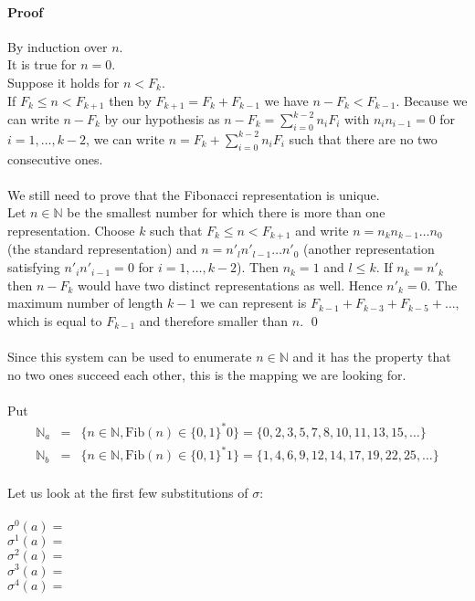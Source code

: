 \documentclass{article}
\begin{document}
\paragraph{Proof} By induction over $n$.\\
It is true for $n = 0$.\\
Suppose it holds for $n < F_k$.\\
If $F_k \le n < F_{k + 1}$ then by $F_{k + 1} = F_k + F_{k - 1}$ we have 
$n - F_k < F_{k - 1}$. Because we can write $n - F_k$ by our hypothesis as
$n - F_k = \sum_{i = 0}^{k - 2} n_i F_i$ with $n_i n_{i - 1} = 0$ for
$i = 1, \ldots, k - 2$, we can write $n = F_k + \sum_{i = 0}^{k - 2} n_i F_i$ 
such that there are no two consecutive ones.\\
\\
We still need to prove that the Fibonacci representation is unique.\\
Let $n \in \mathbb{N}$ be the smallest number for which there is more than one
representation. Choose $k$ such that $F_k \le n < F_{k + 1}$ and write
$n = n_k n_{k - 1} \ldots n_0$ (the standard representation) and
$n = n'_l n'_{l - 1} \ldots n'_0$ (another representation satisfying 
$n'_i n'_{i - 1} = 0$ for $i = 1, \ldots, k - 2$). Then $n_k = 1$ and $l \le k$.
If $n_k = n'_k$ then $n - F_k$ would have two distinct representations as well.
Hence $n'_k = 0$.
The maximum number of length $k - 1$ we can represent is 
$F_{k - 1} + F_{k - 3} + F_{k - 5} + \ldots$, which is equal to $F_{k - 1}$ and 
therefore smaller than $n$. \qed\\
\\
Since this system can be used to enumerate $n \in \mathbb{N}$ and it has the
property that no two ones succeed each other, this is the mapping we are
looking for.\\
\\
Put
\begin{eqnarray*}
  \mathbb{N}_a &=& \{n \in \mathbb{N}, \mathrm{Fib}(n) \in \{0, 1\}^* 0\} = 
                   \{0, 2, 3, 5, 7, 8, 10, 11, 13, 15, \ldots\}\\
  \mathbb{N}_b &=& \{n \in \mathbb{N}, \mathrm{Fib}(n) \in \{0, 1\}^* 1\} =
                   \{1, 4, 6, 9, 12, 14, 17, 19, 22, 25, \ldots\}
\end{eqnarray*}
\\
Let us look at the first few substitutions of $\sigma$:\\
\\
$\sigma^0(a) =$ \\
$\sigma^1(a) =$ \\
$\sigma^2(a) =$ \\
$\sigma^3(a) =$ \\
$\sigma^4(a) =$ 
\end{document}

